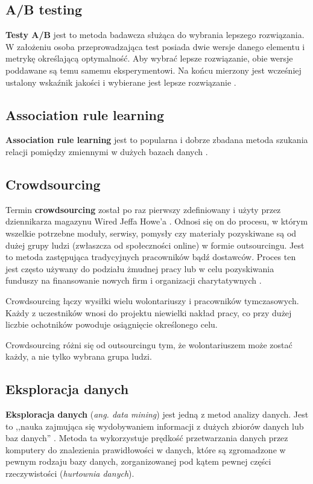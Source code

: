 \documentclass[twocolumn]{svjour3}          %
\begin{document}
\subsection{A/B testing}
\label{sub:a/b_testing}
\textbf{Testy A/B} jest to metoda badawcza służąca do wybrania lepszego rozwiązania. W założeniu osoba przeprowadzająca test posiada dwie wersje danego elementu i metrykę określającą optymalność. Aby wybrać lepsze rozwiązanie, obie wersje poddawane są temu samemu eksperymentowi. Na końcu mierzony jest wcześniej ustalony wskaźnik jakości i wybierane jest lepsze rozwiązanie \cite{paras10}.

\subsection{Association rule learning}
\label{sub:association_rule_learning}
\textbf{Association rule learning} jest to popularna i dobrze zbadana metoda szukania relacji pomiędzy zmiennymi w dużych bazach danych \cite{tan2005introduction}.

\subsection{Crowdsourcing}
\label{sub:crowdsourcing}
Termin \textbf{crowdsourcing} został po raz pierwszy zdefiniowany i użyty przez dziennikarza magazynu Wired Jeffa Howe’a \cite{Howe2006}. Odnosi się on do procesu, w którym wszelkie potrzebne moduły, serwisy, pomysły czy materiały pozyskiwane są od dużej grupy ludzi (zwłaszcza od społeczności online) w formie outsourcingu. Jest to metoda zastępująca tradycyjnych pracowników bądź dostawców. Proces ten jest często używany do podziału żmudnej pracy lub w celu pozyskiwania funduszy na finansowanie nowych firm i organizacji charytatywnych \cite{Howe2006}.

Crowdsourcing łączy wysiłki wielu wolontariuszy i pracowników tymczasowych. Każdy z uczestników wnosi do projektu niewielki nakład pracy, co przy dużej liczbie ochotników powoduje osiągnięcie określonego celu.

Crowdsourcing różni się od outsourcingu tym, że wolontariuszem może zostać każdy, a nie tylko wybrana grupa ludzi.

\subsection{Eksploracja danych}
\label{sub:eksploracja_danych}
\textbf{Eksploracja danych} (\textit{ang. data mining}) jest jedną z metod analizy danych. Jest to ,,nauka zajmująca się wydobywaniem informacji z dużych zbiorów danych lub baz danych'' \cite{Hand01}. Metoda ta wykorzystuje prędkość przetwarzania danych przez komputery do znalezienia prawidłowości w danych, które są zgromadzone w pewnym rodzaju bazy danych, zorganizowanej pod kątem pewnej części rzeczywistości (\textit{hurtownia danych}). 
\end{document}
